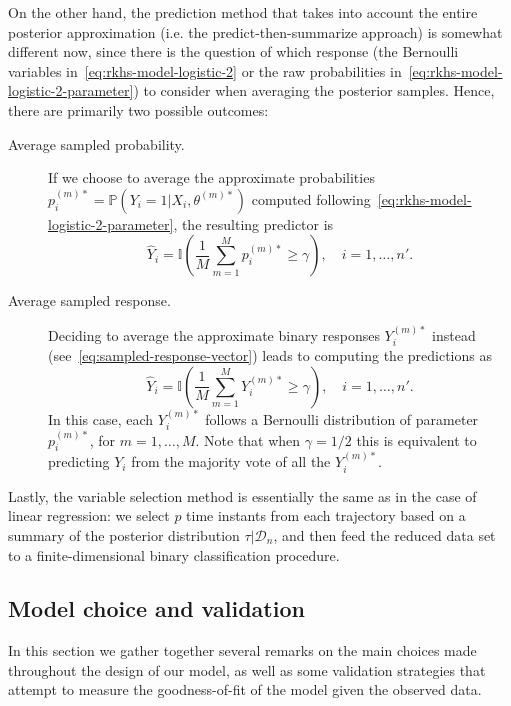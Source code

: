 \documentclass[ba]{imsart}
\numberwithin{equation}{section}
\theoremstyle{plain}
\begin{document}
On the other hand, the prediction method that takes into account the entire posterior approximation (i.e. the predict-then-summarize approach) is somewhat different now, since there is the question of which response (the Bernoulli variables in~\eqref{eq:rkhs-model-logistic-2} or the raw probabilities in~\eqref{eq:rkhs-model-logistic-2-parameter}) to consider when averaging the posterior samples. Hence, there are primarily two possible outcomes:
\begin{description}
  \item[Average sampled probability.] If we choose to average the approximate probabilities \(p_i^{(m)*} = \mathbb P(Y_i =1 | X_i,\theta^{(m)*})\) computed following~\eqref{eq:rkhs-model-logistic-2-parameter}, the resulting predictor is
  \[
    \hat Y_i = \mathbb I\left(\frac{1}{M} \sum_{m=1}^M p_i^{(m)*} \geq \gamma\right), \quad i=1,\dots,n'.
  \]
  \item[Average sampled response.] Deciding to average the approximate binary responses \(Y_i^{(m)*}\) instead (see~\eqref{eq:sampled-response-vector}) leads to computing the predictions as
\[
  \hat Y_i = \mathbb I\left(\frac{1}{M} \sum_{m=1}^M Y_i^{(m)*} \geq \gamma\right), \quad i=1,\dots,n'.
\]
In this case, each \(Y_i^{(m)*}\) follows a Bernoulli distribution of parameter \(p_i^{(m)*}\), for \(m=1,\dots,M\). Note that when \(\gamma=1/2\) this is equivalent to predicting \(Y_i\) from the majority vote of all the \(Y_i^{(m)*}\).
\end{description}

Lastly, the variable selection method is essentially the same as in the case of linear regression: we select \(p\) time instants from each trajectory based on a summary of the posterior distribution \(\tau | \mathcal D_n\), and then feed the reduced data set to a finite-dimensional binary classification procedure.

\subsection{Model choice and validation}\label{sec:model-choice}

In this section we gather together several remarks on the main choices made throughout the design of our model, as well as some validation strategies that attempt to measure the goodness-of-fit of the model given the observed data.
\end{document}

